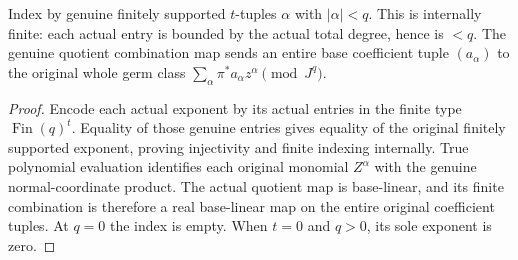 \begin{definition}
\label{hir:relative-normal-basis-actual-finite-exponents}
\leanok
Index by genuine finitely supported $t$-tuples $\alpha$ with $|\alpha|<q$.
This is internally finite: each actual entry is bounded by the actual total
degree, hence is $<q$. The genuine quotient combination map sends an entire
base coefficient tuple $(a_\alpha)$ to the original whole germ class
$\sum_\alpha \pi^*a_\alpha z^\alpha\pmod{J^q}$.
\end{definition}
\begin{proof}
Encode each actual exponent by its actual entries in the finite type
$\operatorname{Fin}(q)^t$. Equality of those genuine entries gives equality
of the original finitely supported exponent, proving injectivity and finite
indexing internally. True polynomial evaluation identifies each original
monomial $Z^\alpha$ with the genuine normal-coordinate product. The actual
quotient map is base-linear, and its finite combination is therefore a real
base-linear map on the entire original coefficient tuples. At $q=0$ the
index is empty. When $t=0$ and $q>0$, its sole exponent is zero.
\end{proof}

